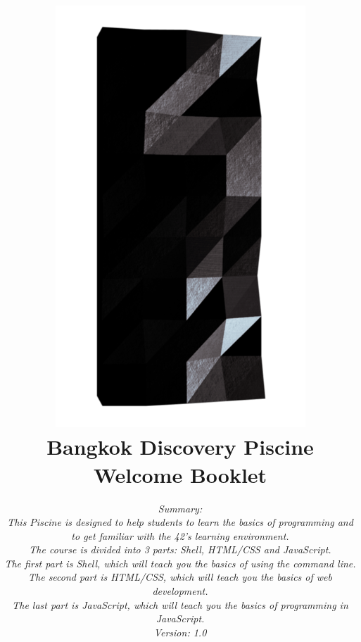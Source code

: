 \documentclass[12pt, a4paper]{report}
\begin{document}
\begin{titlepage}
	\centering
	\title{%
		\vspace{-6cm}
		\includegraphics[scale=1.8]{Logo_42.png} \\
		\vspace{1cm}
		\huge Bangkok Discovery Piscine\\
		\vspace{.6cm}
		\LARGE Welcome Booklet
		}

	\date{%
		\vspace{2.2cm}
		\it\normalsize Summary: \\
		This Piscine is designed to help students to learn the basics of programming and to get familiar with the 42's learning environment. \\
		The course is divided into 3 parts: Shell, HTML/CSS and JavaScript. \\
		The first part is Shell, which will teach you the basics of using the command line. \\
		The second part is HTML/CSS, which will teach you the basics of web development.\\
		The last part is JavaScript, which will teach you the basics of programming in JavaScript.\\
		\vspace{.8cm}
		Version: 1.0
		}
	\maketitle


	\end{titlepage}
\newpage
	\renewcommand{\thechapter}{\Roman{chapter}}
	{\small \tableofcontents}
\end{document}
